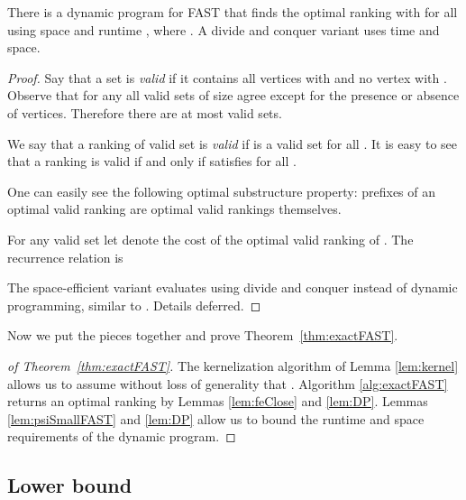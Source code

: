 \documentclass[envcountsame,oribibl]{llncs}
\newcommand{\fast}{\textsc{FAST}}
\begin{document}
\begin{lemma}\label{lem:DP}
There is a dynamic program for \fast{} that finds the optimal ranking  with  for all  using space and runtime , where . A divide and conquer variant uses  time and  space.
\end{lemma}

\begin{proof}
Say that a set  is \emph{valid} if it contains all vertices  with  and no vertex  with . Observe that for any  all valid sets of size  agree except for the presence or absence of  vertices.  Therefore there are at most  valid sets.

We say that a ranking  of valid set  is \emph{valid} if  is a valid set for all . It is easy to see that a ranking  is valid if and only if satisfies  for all .

One can easily see the following optimal substructure property: prefixes of an optimal  valid ranking are optimal valid rankings themselves.

For any valid set  let  denote the cost of the optimal valid ranking of . The recurrence relation is


The space-efficient variant evaluates  using divide and conquer instead of dynamic programming, similar to \cite{Dom06}. Details deferred.
\end{proof}

Now we put the pieces together and prove Theorem~\ref{thm:exactFAST}.
\begin{proof}[of Theorem~\ref{thm:exactFAST}]
The kernelization algorithm of Lemma \ref{lem:kernel} allows us to assume without loss of generality that . Algorithm \ref{alg:exactFAST} returns an optimal ranking by Lemmas  \ref{lem:feClose} and \ref{lem:DP}. Lemmas \ref{lem:psiSmallFAST} and \ref{lem:DP} allow us to bound the runtime and space requirements of the dynamic program.
\end{proof}

\subsection{Lower bound}  \label{sec:lb}
\end{document}
